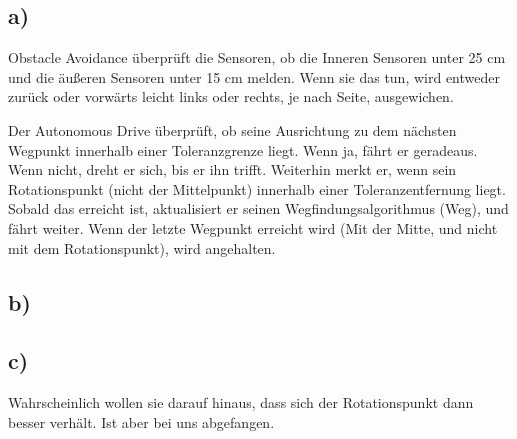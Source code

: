 \documentclass{../Vorlage/mat}
\begin{document}
\subsection*{a)}
Obstacle Avoidance überprüft die Sensoren, ob die Inneren Sensoren unter 25 cm und die äußeren Sensoren unter 15 cm melden. Wenn sie das tun, wird entweder zurück oder vorwärts leicht links oder rechts, je nach Seite, ausgewichen.

Der Autonomous Drive überprüft, ob seine Ausrichtung zu dem nächsten Wegpunkt innerhalb einer Toleranzgrenze liegt. Wenn ja, fährt er geradeaus. Wenn nicht, dreht er sich, bis er ihn trifft. Weiterhin merkt er, wenn sein Rotationspunkt (nicht der Mittelpunkt) innerhalb einer Toleranzentfernung liegt. Sobald das erreicht ist, aktualisiert er seinen  Wegfindungsalgorithmus (Weg), und fährt weiter. Wenn der letzte Wegpunkt erreicht wird (Mit der Mitte, und nicht mit dem Rotationspunkt), wird angehalten.
\subsection*{b)}

\subsection*{c)}
Wahrscheinlich wollen sie darauf hinaus, dass sich der Rotationspunkt dann besser verhält. Ist aber bei uns abgefangen.
\end{document}
